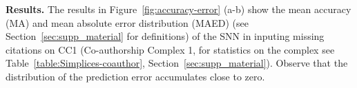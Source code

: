 \textbf{Results.}  The results in Figure~\ref{fig:accuracy-error} (a-b) show the mean accuracy (MA) and mean absolute error distribution (MAED) (see Section~\ref{sec:supp_material} for definitions) of the SNN in inputing missing citations on CC1 (Co-authorship Complex 1, for statistics on the complex see Table~\ref{table:Simplices-coauthor}, Section~\ref{sec:supp_material}). Observe that the distribution of the prediction error accumulates close to zero.
